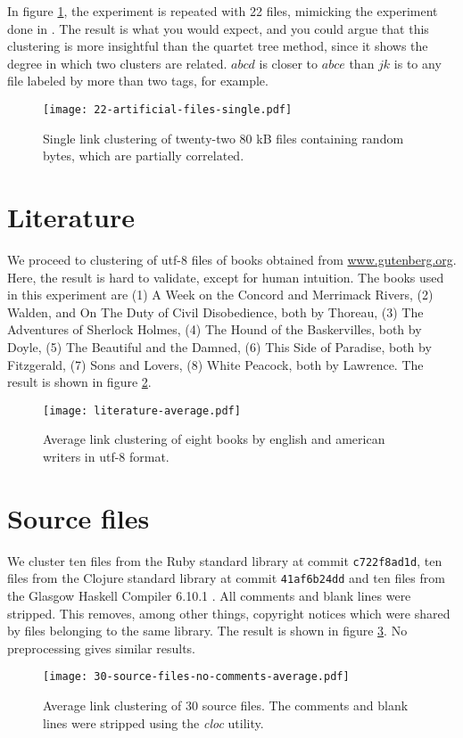 In figure \ref{figure:22_artificial_files}, the experiment is repeated with 22 files, mimicking the experiment done in \cite{Cilibrasi2005}. The result is what you would expect, and you could argue that this clustering is more insightful than the quartet tree method, since it shows the degree in which two clusters are related. $abcd$ is closer to $abce$ than $jk$ is to any file labeled by more than two tags, for example.

\begin{figure}[h!]
  \texttt{[image: 22-artificial-files-single.pdf]}
  \caption{Single link clustering of twenty-two 80 kB files containing random bytes, which are partially correlated.}
  \label{figure:22_artificial_files}
\end{figure}

\section{Literature}

We proceed to clustering of utf-8 files of books obtained from \url{www.gutenberg.org}. Here, the result is hard to validate, except for human intuition. The books used in this experiment are (1) A Week on the Concord and Merrimack Rivers, (2) Walden, and On The Duty of Civil Disobedience, both by Thoreau, (3) The Adventures of Sherlock Holmes, (4) The Hound of the Baskervilles, both by Doyle, (5) The Beautiful and the Damned, (6) This Side of Paradise, both by Fitzgerald, (7) Sons and Lovers, (8) White Peacock, both by Lawrence. The result is shown in figure \ref{figure:8_books}.

\begin{figure}[h!]
  \texttt{[image: literature-average.pdf]}
  \caption{Average link clustering of eight books by english and american writers in utf-8 format.}
  \label{figure:8_books}
\end{figure}


\section{Source files}

We cluster ten files from the Ruby standard library \cite{ruby} at commit \texttt{c722f8ad1d}, ten files from the Clojure standard library \cite{clojure} at commit \texttt{41af6b24dd} and ten files from the Glasgow Haskell Compiler 6.10.1 \cite{ghc}. All comments and blank lines were stripped. This removes, among other things, copyright notices which were shared by files belonging to the same library. The result is shown in figure \ref{figure:30_source_files}. No preprocessing gives similar results.

\begin{figure}[h!]
  \texttt{[image: 30-source-files-no-comments-average.pdf]}
  \caption{Average link clustering of 30 source files. The comments and blank lines were stripped using the \emph{cloc} utility.}
  \label{figure:30_source_files}
\end{figure}


